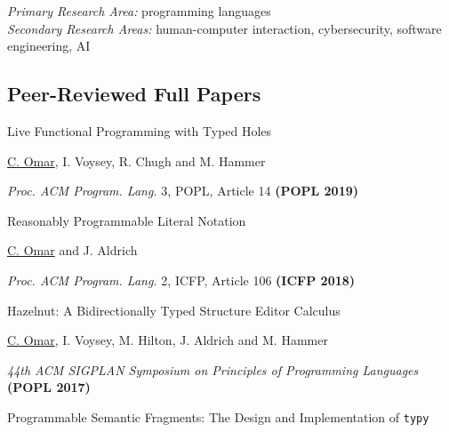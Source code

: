 \documentclass[10pt,letterpaper]{article}
\renewenvironment{itemize}{
  \begin{list}{}{
    \setlength{\leftmargin}{1.25em}
    \setlength{\itemsep}{0.25em}
    \setlength{\parskip}{0pt}
    \setlength{\parsep}{0.2em}
  }
}{
  \end{list}
}
\begin{document}
\textit{Primary Research Area:} programming languages \\
\textit{Secondary Research Areas:} human-computer interaction, cybersecurity, software engineering, AI

\subsection*{Peer-Reviewed Full Papers}

\begin{enumerate}
\item {Live Functional Programming with Typed Holes}
  \begin{itemize}
    \item \underline{C. Omar}, I. Voysey, R. Chugh and M. Hammer
    \item \textit{Proc. ACM Program. Lang.} 3, POPL, Article 14 \textbf{(POPL 2019)}
  \end{itemize}
\item {Reasonably Programmable Literal Notation}
  \begin{itemize}
    \item \underline{C. Omar} and J. Aldrich
    \item \textit{Proc. ACM Program. Lang.} 2, ICFP, Article 106 \textbf{(ICFP 2018)}
  \end{itemize}
\item {Hazelnut: A Bidirectionally Typed Structure Editor Calculus}
  \begin{itemize}
    \item \underline{C. Omar}, I. Voysey, M. Hilton, J. Aldrich and M. Hammer
    \item \textit{44th ACM SIGPLAN Symposium on Principles of Programming Languages} {\textbf{(POPL 2017)}}
  \end{itemize}
\item {Programmable Semantic Fragments: The Design and Implementation of \texttt{typy}}

\end{enumerate}
\end{document}
